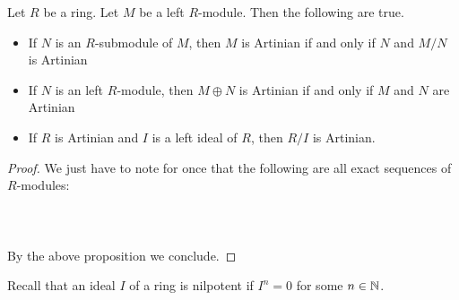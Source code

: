 \documentclass[a4paper]{article}
\begin{document}
\begin{crl}{}{} Let $R$ be a ring. Let $M$ be a left $R$-module. Then the following are true. 
\begin{itemize}
\item If $N$ is an $R$-submodule of $M$, then $M$ is Artinian if and only if $N$ and $M/N$ is Artinian
\item If $N$ is an left $R$-module, then $M\oplus N$ is Artinian if and only if $M$ and $N$ are Artinian
\item If $R$ is Artinian and $I$ is a left ideal of $R$, then $R/I$ is Artinian. 
\end{itemize} 
\begin{proof}
We just have to note for once that the following are all exact sequences of $R$-modules: \\~\\
\\~\\
By the above proposition we conclude. 
\end{proof}
\end{crl}

Recall that an ideal $I$ of a ring is nilpotent if $I^n=0$ for some $n\in\mathbb{N}$. 
\end{document}
